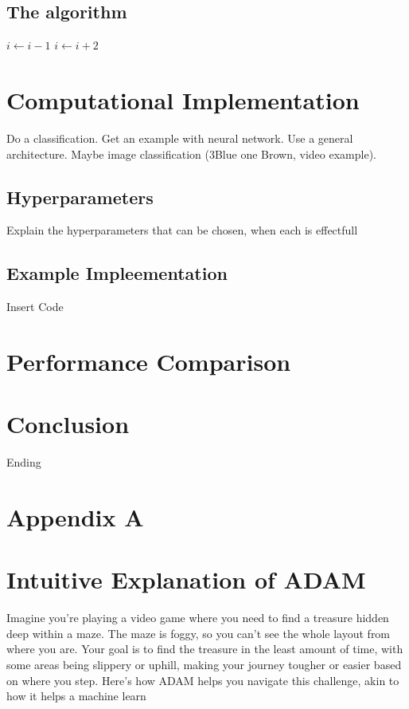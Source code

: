 \documentclass[journal]{IEEEtran}
\begin{document}
\subsection{The algorithm}
\begin{algorithmic}
        \State $i \gets i-1$
    \Else
            \State $i \gets i+2$
        \EndIf
    \EndIf 
\end{algorithmic}







\section{Computational Implementation}
Do a classification.  
Get an example with neural network. Use a general architecture. Maybe image classification (3Blue one Brown, video example).
\subsection{Hyperparameters}
Explain the hyperparameters that can be chosen, when each is effectfull
\subsection{Example Impleementation}
Insert Code

\section{Performance Comparison}

 
\section{Conclusion}
Ending




\onecolumn
\newpage
\pagestyle{fancy}

\section{Appendix A}
\section*{Intuitive Explanation of ADAM}
Imagine you're playing a video game where you need to find a treasure hidden deep within a maze. The maze is foggy, so you can't see the whole layout from where you are. Your goal is to find the treasure in the least amount of time, with some areas being slippery or uphill, making your journey tougher or easier based on where you step. Here's how ADAM helps you navigate this challenge, akin to how it helps a machine learn
\end{document}
